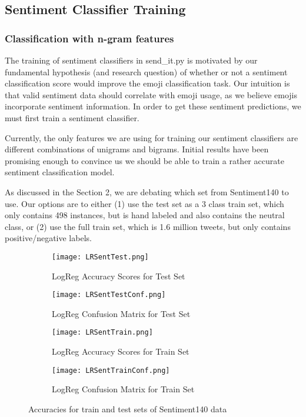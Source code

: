 \documentclass[10pt]{article}
\begin{document}
\subsection{Sentiment Classifier Training}
\subsubsection{Classification with n-gram features}
The training of sentiment classifiers in send\_it.py is motivated by our fundamental hypothesis (and research question) of whether or not a sentiment classification score would improve the emoji classification task. Our intuition is that valid sentiment data should correlate with emoji usage, as we believe emojis incorporate sentiment information. In order to get these sentiment predictions, we must first train a sentiment classifier.

Currently, the only features we are using for training our sentiment classifiers are different combinations of unigrams and bigrams. Initial results have been promising enough to convince us we should be able to train a rather accurate sentiment classification model.

As discussed in the Section 2, we are debating which set from Sentiment140 to use. Our options are to either (1) use the test set as a 3 class train set, which only contains 498 instances, but is hand labeled and also contains the neutral class, or (2) use the full train set, which is 1.6 million tweets, but only contains positive/negative labels.

\begin{figure}
\centering
\begin{subfigure}{.5\textwidth}
  \centering
  \texttt{[image: LRSentTest.png]}
  \caption{LogReg Accuracy Scores for Test Set}
  \label{fig:LRSentTest}
\end{subfigure}%
\begin{subfigure}{.5\textwidth}
  \centering
  \texttt{[image: LRSentTestConf.png]}
  \caption{LogReg Confusion Matrix for Test Set}
  \label{fig:LRSentTestConf}
\end{subfigure}
\begin{subfigure}{.5\textwidth}
  \centering
  \texttt{[image: LRSentTrain.png]}
  \caption{LogReg Accuracy Scores for Train Set}
  \label{fig:LRSentTrain}
\end{subfigure}%
\begin{subfigure}{.5\textwidth}
  \centering
  \texttt{[image: LRSentTrainConf.png]}
  \caption{LogReg Confusion Matrix for Train Set}
  \label{fig:LRSentTrainConf}
\end{subfigure}
\caption{Accuracies for train and test sets of Sentiment140 data}
\label{fig:sentdata}
\end{figure}
\end{document}
